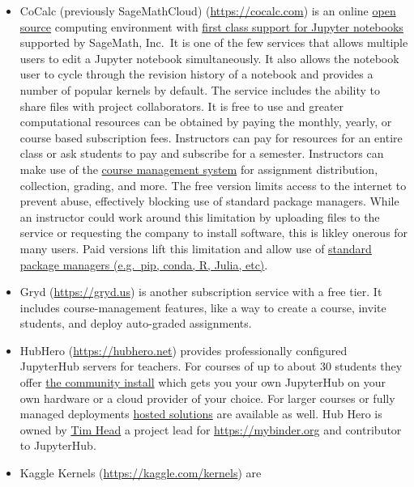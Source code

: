 \documentclass[]{book}
\begin{document}
\begin{itemize}
\item
  CoCalc (previously SageMathCloud)
  (\url{https://cocalc.com}) is an online \href{https://github.com/sagemathinc/}{open
  source} computing environment with \href{https://cocalc.com/doc/jupyter-notebook.html}{first
  class support for Jupyter
  notebooks} supported by
  SageMath, Inc.~It is one of the few services that allows multiple users to
  edit a Jupyter notebook simultaneously. It also allows the notebook user to
  cycle through the revision history of a notebook and provides a number of
  popular kernels by default. The service includes the ability to share files
  with project collaborators. It is free to use and greater computational
  resources can be obtained by paying the monthly, yearly, or course based
  subscription fees. Instructors can pay for resources for an entire class or
  ask students to pay and subscribe for a semester. Instructors can make use
  of the \href{https://tutorial.cocalc.com/}{course management system} for
  assignment distribution, collection, grading, and more. The free version
  limits access to the internet to prevent abuse, effectively blocking use of
  standard package managers. While an instructor could work around this limitation
  by uploading files to the service or requesting the company to install
  software, this is likley onerous for many users. Paid versions lift this
  limitation and allow use of \href{https://github.com/sagemathinc/cocalc/wiki/How-to-Install-Python-Packages-into-CoCalc}{standard package managers (e.g.~pip, conda, R,
  Julia,
  etc)}.
\item
  Gryd (\url{https://gryd.us}) is another subscription
  service with a free tier. It includes course-management features,
  like a way to create a course, invite students, and deploy
  auto-graded assignments.
\item
  HubHero (\url{https://hubhero.net}) provides professionally
  configured JupyterHub servers for teachers. For courses of up to about 30
  students they offer \href{https://hubhero.net/community/}{the community install} which
  gets you your own JupyterHub on your own hardware or a cloud provider of your
  choice. For larger courses or fully managed deployments
  \href{https://hubhero.net/hosted/}{hosted solutions} are available as well. Hub
  Hero is owned by \href{https://github.com/betatim/}{Tim Head} a project lead for
  \url{https://mybinder.org} and contributor to JupyterHub.
\item
  Kaggle Kernels (\url{https://kaggle.com/kernels}) are

\end{itemize}
\end{document}
